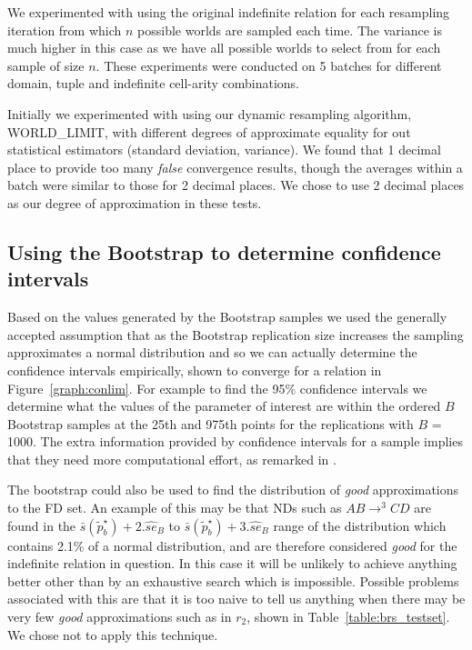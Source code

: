 We experimented with 
using the original indefinite 
relation for each resampling iteration from which $n$ possible worlds are
sampled each time. The variance is much higher in this case as we
have all possible worlds to select from for each sample of size
$n$. These experiments were conducted on 5 batches for different
domain, tuple and indefinite cell-arity combinations.

\medskip

Initially we experimented with using our dynamic resampling algorithm,
WORLD\_LIMIT, with different degrees of approximate equality for out
statistical estimators (standard deviation, variance). We found that 1
decimal place to provide too many {\em false} convergence results,
though the averages within a batch were similar to those for 2 decimal
places. We chose to use 2 decimal places as our degree of
approximation in these tests.


\subsection{Using the Bootstrap to determine confidence intervals}

Based on the values generated by the Bootstrap samples we 
used the generally accepted assumption that as the Bootstrap
replication size increases the 
sampling approximates a normal distribution and so we can actually
determine the confidence intervals empirically, shown to converge for
a relation in Figure~\ref{graph:conlim}. For example to find the
95\% confidence intervals we determine what the values of the 
parameter of interest are within the ordered $B$ Bootstrap samples at the
25th and 975th points for the replications with $B$ = 1000. The extra
information provided by confidence intervals for a sample implies that
they need more computational effort, as remarked in \cite{et93}. 

The bootstrap could also be used to find the distribution of {\em good}
approximations to the FD set.
An example of this may be that
NDs such as $AB \to^3 CD$ are found in the $\bar{s}(\tilde{p}^\star_b) + 2.\hat{se}_B$ to
$\bar{s}(\tilde{p}^\star_b) + 3.\hat{se}_B$ 
 range of the distribution  which contains 2.1\% of a normal
distribution, and are therefore considered {\em good} for the
indefinite relation in question.
In this case it will be unlikely to achieve anything better other
than by an exhaustive search which is impossible. Possible problems 
associated with this are that it is too naive to tell us anything
when there may be very few {\em good} approximations such as in
$r_2$, shown in Table~\ref{table:brs_testset}. We chose not to apply this technique.

